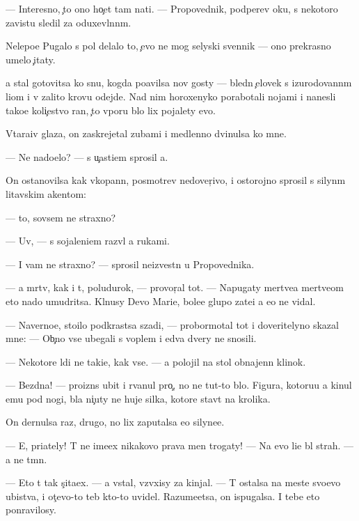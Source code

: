 \documentclass[10pt]{book}
\begin{document}
— Interesno, {\c}to ono ho{\c}et tam na{\y}ti. — Propovednik, podperev {\x}oku, s nekotoro{\y} zavist{\y}u sledil za oduxevl{\e}nn{\yi}m.

Nelepo{\y}e Pugalo s pol{\ia} delalo to, {\c}evo ne mog selyski{\y} sv{\ia}{\x}ennik — ono prekrasno umelo {\c}itaty.

{\Y}a stal gotovitsa ko snu, kogda po{\y}avilsa nov{\yi}{\y} gosty — bledn{\yi}{\y} {\c}elovek s izurodovann{\yi}m li{\q}om i v zalito{\y} krov{\y}u odejde. Nad nim horoxenyko porabotali nojami i nanesli tako{\y}e koli{\c}estvo ran, {\c}to vporu b{\yi}lo lix pojalety {\y}evo.

V{\yi}tara{\x}iv glaza, on zaskrejetal zubami i medlenno dvinulsa ko mne.

— Ne nado{\y}elo? — s u{\c}asti{\y}em sprosil {\y}a.

On ostanovilsa kak vkopann{\yi}{\y}, posmotrev nedover{\c}ivo, i ostorojno sprosil s silyn{\yi}m litavskim ak{\q}entom:

— {\C}to, sovsem ne straxno?

— Uv{\yi}, — s sojaleni{\y}em razv{\e}l {\y}a rukami.

— I vam ne straxno? — sprosil ne{\y}izvestn{\yi}{\y} u Propovednika.

— {\Y}a m{\e}rtv, kak i t{\yi}, poludurok, — provor{\c}al tot. — Napugaty mertve{\q}a mertve{\q}om eto nado umudritsa. Kl{\ia}nusy Devo{\y} Mari{\y}e{\y}, bole{\y}e glupo{\y} zate{\y}i {\y}a {\y}e{\x}o ne vidal.

— Naverno{\y}e, sto{\y}ilo podkrastsa szadi, — probormotal tot i doveritelyno skazal mne: — Ob{\yi}{\c}no vse ubegali s voplem i {\y}edva dvery ne snosili.

— Nekotor{\yi}{\y}e l{\iu}di ne taki{\y}e, kak vse. — {\Y}a polojil na stol obnajenn{\yi}{\y} klinok.

— Bezdna! — proizn{\e}s ubit{\yi}{\y} i rvanul pro{\c}, no ne tut-to b{\yi}lo. Figura, kotoru{\y}u {\y}a kinul {\y}emu pod nogi, b{\yi}la ni{\c}uty ne huje silka, kotor{\yi}{\y}e stav{\ia}t na krolika.

On dernulsa raz, drugo{\y}, no lix zaputalsa {\y}e{\x}o silyne{\y}e.

— E{\y}, pri{\y}ately! T{\yi} ne ime{\y}ex nikakovo prava men{\ia} trogaty! — Na {\y}evo li{\q}e b{\yi}l strah. — {\Y}a ne t{\e}mn{\yi}{\y}.

— Eto t{\yi} tak s{\c}ita{\y}ex. — {\Y}a vstal, vz{\ia}vxisy za kinjal. — T{\yi} ostalsa na meste svo{\y}evo ubi{\y}stva, i ot{\c}evo-to teb{\ia} kto-to uvidel. Razume{\y}etsa, on ispugalsa. I tebe eto ponravilosy.
\end{document}
